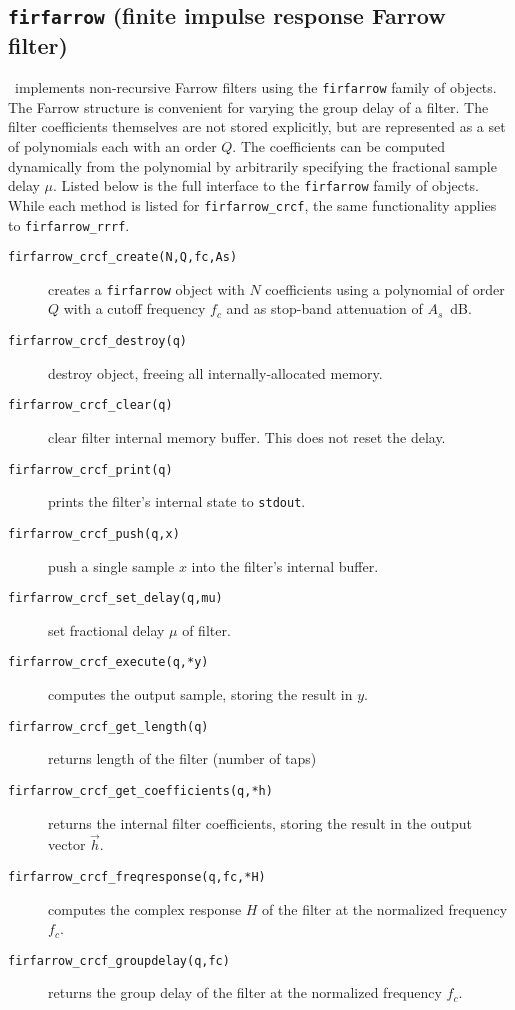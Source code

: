% 
%
\subsection{{\tt firfarrow} (finite impulse response Farrow filter)}
\label{module:filter:firfarrow}
\liquid\ implements non-recursive Farrow filters using the
{\tt firfarrow} family of objects.
The Farrow structure is convenient for varying the group delay of a
filter.
The filter coefficients themselves are not stored explicitly, but are
represented as a set of polynomials each with an order $Q$.
The coefficients can be computed dynamically from the polynomial by
arbitrarily specifying the fractional sample delay $\mu$.
%
Listed below is the full interface to the {\tt firfarrow} family of
objects.
While each method is listed for {\tt firfarrow\_crcf}, the same
functionality applies to {\tt firfarrow\_rrrf}.
%
\begin{description}
\item[{\tt firfarrow\_crcf\_create(N,Q,fc,As)}]
    creates a {\tt firfarrow} object with $N$ coefficients using a
    polynomial of order $Q$ with a cutoff frequency $f_c$ and as
    stop-band attenuation of $A_s$~dB.
\item[{\tt firfarrow\_crcf\_destroy(q)}]
    destroy object, freeing all internally-allocated memory.
\item[{\tt firfarrow\_crcf\_clear(q)}]
    clear filter internal memory buffer.
    This does not reset the delay.
\item[{\tt firfarrow\_crcf\_print(q)}]
    prints the filter's internal state to {\tt stdout}.
\item[{\tt firfarrow\_crcf\_push(q,x)}]
    push a single sample $x$ into the filter's internal buffer.
\item[{\tt firfarrow\_crcf\_set\_delay(q,mu)}]
    set fractional delay $\mu$ of filter.
\item[{\tt firfarrow\_crcf\_execute(q,*y)}]
    computes the output sample, storing the result in $y$.
\item[{\tt firfarrow\_crcf\_get\_length(q)}]
    returns length of the filter (number of taps)
\item[{\tt firfarrow\_crcf\_get\_coefficients(q,*h)}]
    returns the internal filter coefficients, storing the result in the
    output vector $\vec{h}$.
\item[{\tt firfarrow\_crcf\_freqresponse(q,fc,*H)}]
    computes the complex response $H$ of the filter at the normalized
    frequency $f_c$.
\item[{\tt firfarrow\_crcf\_groupdelay(q,fc)}]
    returns the group delay of the filter at the normalized
    frequency $f_c$.
\end{description}
